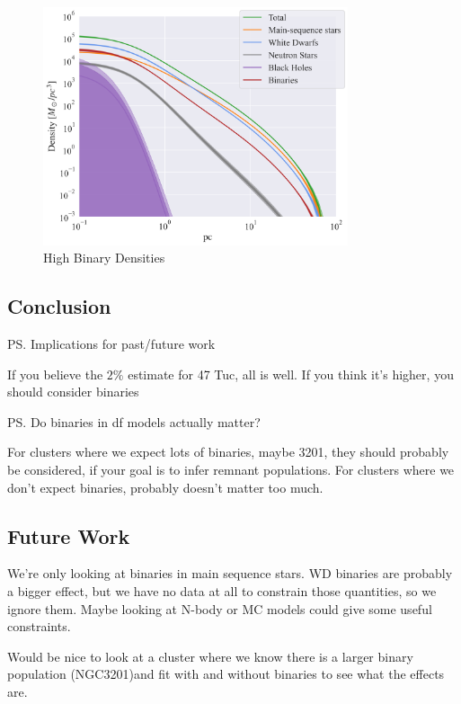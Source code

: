 \begin{figure}
	\centering
	\includegraphics[width=0.8\textwidth]{figures/high_bin_model/density.png}
	\caption{High Binary Densities}
	\label{fig:highbin_model_densities}
\end{figure}



\subsection{Conclusion}

\ps{Implications for past/future work}

If you believe the $2\%$ estimate for 47 Tuc, all is well. If you think it's higher, you should
consider binaries

\ps{Do binaries in df models actually matter?}


For clusters where we expect lots of binaries, maybe 3201, they should probably be considered, if
your goal is to infer remnant populations. For clusters where we don't expect binaries, probably
doesn't matter too much.








\subsection{Future Work}

We're only looking at binaries in main sequence stars. WD binaries are probably a bigger effect, but
we have no data at all to constrain those quantities, so we ignore them. Maybe looking at N-body or
MC models could give some useful constraints.

Would be nice to look at a cluster where we know there is a larger binary population (NGC3201)and
fit with and without binaries to see what the effects are.